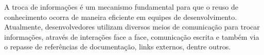 

%

A troca de informações é um mecanismo fundamental para que o reuso de conhecimento ocorra de maneira eficiente em equipes de desenvolvimento. Atualmente, desenvolvedores utilizam diversos meios de comunicação para trocar informações, através de interações face a face, comunicação escrita e também via o repasse de referências de documentação, links externos, dentre outros.~\cite{Storey2014}~\cite{Olson2000}~\cite{CubraniC2004}

